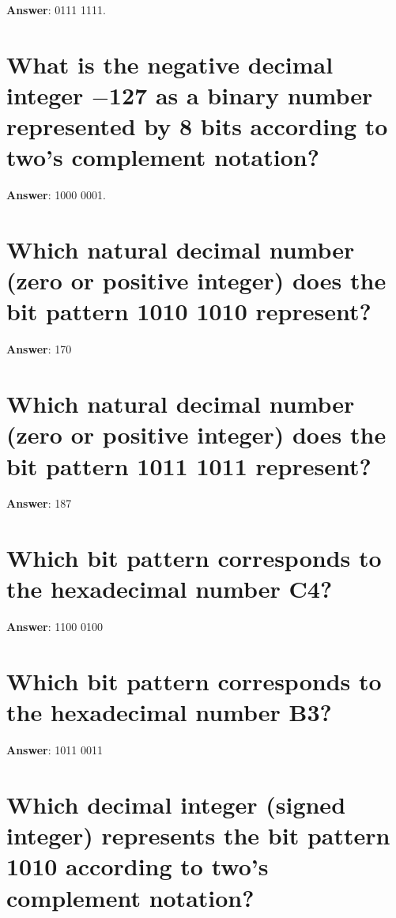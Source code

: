 \documentclass[a4paper,11pt,oneside]{book}
\begin{document}
\begin{sloppypar}
\label{q:371:sa:en:True}

\textbf{Answer}: 0111 1111.



\section{What is the negative decimal integer \ensuremath{-}127 as a binary number represented by 8 bits according to two's complement notation?}

\label{q:372:sa:en:True}

\textbf{Answer}: 1000 0001.



\section{Which natural decimal number (zero or positive integer) does the bit pattern 1010 1010 represent?}

\label{q:373:sa:en:True}

\textbf{Answer}: 170



\section{Which natural decimal number (zero or positive integer) does the bit pattern 1011 1011 represent?}

\label{q:374:sa:en:True}

\textbf{Answer}: 187



\section{Which bit pattern corresponds to the hexadecimal number C4?}

\label{q:375:sa:en:True}

\textbf{Answer}: 1100 0100



\section{Which bit pattern corresponds to the hexadecimal number B3?}

\label{q:376:sa:en:True}

\textbf{Answer}: 1011 0011



\section{Which decimal integer (signed integer) represents the bit pattern 1010 according to two{\textquoteright}s complement notation?}


\end{sloppypar}
\end{document}
